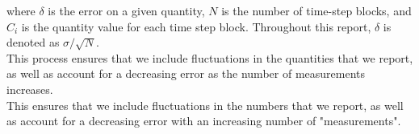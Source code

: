 \documentclass{article}
\begin{document}
\begin{multicols}{2}
\noindent where $\delta$ is the error on a given quantity, $N$ is the number of time-step blocks, and $C_i$ is the quantity value for each time step block.  Throughout this report, $\delta$ is denoted as $\sigma /\sqrt{N}$.  \\

This process ensures that we include fluctuations in the quantities that we report, as well as account for a decreasing error as the number of measurements increases.  \\

This ensures that we include fluctuations in the numbers that we report, as well as account for a decreasing error with an increasing number of "measurements".  

\end{multicols}




  
\end{document}
